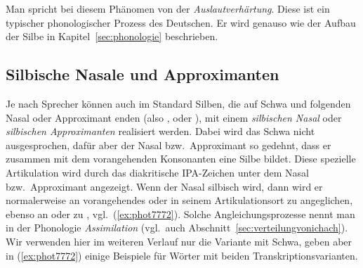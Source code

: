 \begin{exe}
  \ex\label{ex:phot7241}
  \begin{xlist}
  \end{xlist}
  \ex\label{ex:phot7242}
  \begin{xlist}
  \end{xlist}
  \ex\label{ex:phot7243}
  \begin{xlist}
  \end{xlist}
\end{exe}

Man spricht bei diesem Phänomen von der \textit{Auslautverhärtung}.
Diese ist ein typischer phonologischer Prozess des Deutschen.
Er wird genauso wie der Aufbau der Silbe in Kapitel~\ref{sec:phonologie} beschrieben.

\subsection{Silbische Nasale und Approximanten}

\label{sec:silbischenasaleapproximanten}

Je nach Sprecher können auch im Standard Silben, die auf Schwa und folgenden Nasal oder Approximant enden (also \textipa{[@n]}, \textipa{[@m]} oder \textipa{[@l]}), mit einem \textit{silbischen Nasal} oder \textit{silbischen Approximanten} realisiert werden.
Dabei wird das Schwa nicht ausgesprochen, dafür aber der Nasal bzw.\ Approximant so gedehnt, dass er zusammen mit dem vorangehenden Konsonanten eine Silbe bildet.
Diese spezielle Artikulation wird durch das diakritische IPA-Zeichen \textipa{[\s{ }]} unter dem Nasal bzw.\ Approximant angezeigt.
Wenn der Nasal \textipa{[n]} silbisch wird, dann wird er normalerweise an vorangehendes \textipa{[b]} oder \textipa{[p]} in seinem Artikulationsort zu \textipa{[m]} angeglichen, ebenso an \textipa{[g]} oder \textipa{[k]} zu \textipa{[N]}, vgl.\ (\ref{ex:phot7772}).
Solche Angleichungsprozesse nennt man in der Phonologie \textit{Assimilation} (vgl.\ auch Abschnitt~\ref{sec:verteilungvonichach}).
Wir verwenden hier im weiteren Verlauf nur die Variante mit Schwa, geben aber in (\ref{ex:phot7772}) einige Beispiele für Wörter mit beiden Transkriptionsvarianten.


